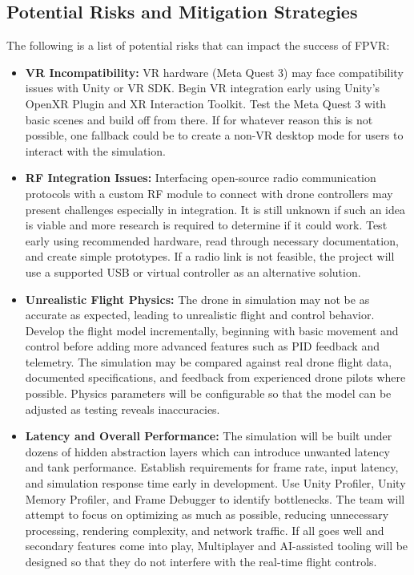 \documentclass{article}
\begin{document}
\subsection{Potential Risks and Mitigation Strategies}
The following is a list of potential risks that can impact the success of FPVR:
\begin{itemize}
    \item \textbf{VR Incompatibility:} VR hardware (Meta Quest 3) may face compatibility issues
    with Unity or VR SDK. Begin VR integration early using Unity's OpenXR
    Plugin and XR Interaction Toolkit. Test the Meta Quest 3 with basic
    scenes and build off from there. If for whatever reason this is not possible, one fallback could
    be to create a non-VR desktop mode for users to interact with the simulation.
    \item \textbf{RF Integration Issues:} Interfacing open-source radio communication protocols with
    a custom RF module to connect with drone controllers may present challenges especially in integration. 
    It is still unknown if such an idea is viable and more research is required to determine if it could work.
    Test early using recommended hardware, read through necessary documentation, and create simple
    prototypes. If a radio link is not feasible, the project will use a supported USB or virtual
    controller as an alternative solution. 
    \item \textbf{Unrealistic Flight Physics:} The drone in simulation may not be as accurate as 
    expected, leading to unrealistic flight and control behavior. Develop the flight model incrementally,
    beginning with basic movement and control before adding more advanced features such as PID feedback and
    telemetry. The simulation may be compared against real drone flight data, documented
    specifications, and feedback from experienced drone pilots where possible.
    Physics parameters will be configurable so that the model can be adjusted as
    testing reveals inaccuracies.
    \item \textbf{Latency and Overall Performance:} The simulation will be built under dozens of
    hidden abstraction layers which can introduce unwanted latency and tank performance.
    Establish requirements for frame rate, input latency, and simulation response time early in development.
    Use Unity Profiler, Unity Memory Profiler, and Frame Debugger to identify
    bottlenecks. The team will attempt to focus on optimizing as much as possible, reducing
    unnecessary processing, rendering complexity, and network traffic. If all goes well and secondary
    features come into play, Multiplayer and AI-assisted tooling will be
    designed so that they do not interfere with the real-time flight controls.
\end{itemize}
\end{document}
